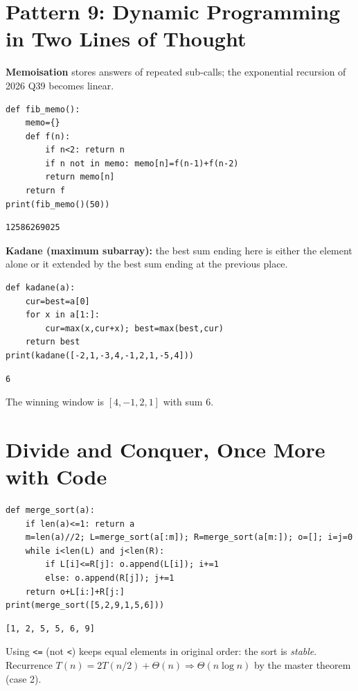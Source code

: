 \documentclass[11pt,a4paper]{article}
\newcommand{\py}[1]{\texttt{#1}}
\begin{document}
\section{Pattern 9: Dynamic Programming in Two Lines of Thought}
\textbf{Memoisation} stores answers of repeated sub-calls; the exponential recursion of 2026 Q39 becomes linear.
\begin{lstlisting}
def fib_memo():
    memo={}
    def f(n):
        if n<2: return n
        if n not in memo: memo[n]=f(n-1)+f(n-2)
        return memo[n]
    return f
print(fib_memo()(50))
\end{lstlisting}
\begin{lstlisting}[style=out]
12586269025
\end{lstlisting}
\textbf{Kadane (maximum subarray):} the best sum ending here is either the element alone or it extended by the best sum ending at the previous place.
\begin{lstlisting}
def kadane(a):
    cur=best=a[0]
    for x in a[1:]:
        cur=max(x,cur+x); best=max(best,cur)
    return best
print(kadane([-2,1,-3,4,-1,2,1,-5,4]))
\end{lstlisting}
\begin{lstlisting}[style=out]
6
\end{lstlisting}
The winning window is $[4,-1,2,1]$ with sum $6$.

\section{Divide and Conquer, Once More with Code}
\begin{lstlisting}
def merge_sort(a):
    if len(a)<=1: return a
    m=len(a)//2; L=merge_sort(a[:m]); R=merge_sort(a[m:]); o=[]; i=j=0
    while i<len(L) and j<len(R):
        if L[i]<=R[j]: o.append(L[i]); i+=1
        else: o.append(R[j]); j+=1
    return o+L[i:]+R[j:]
print(merge_sort([5,2,9,1,5,6]))
\end{lstlisting}
\begin{lstlisting}[style=out]
[1, 2, 5, 5, 6, 9]
\end{lstlisting}
Using \py{<=} (not \py{<}) keeps equal elements in original order: the sort is \emph{stable}. Recurrence $T(n)=2T(n/2)+\Theta(n)\Rightarrow\Theta(n\log n)$ by the master theorem (case 2).
\end{document}
